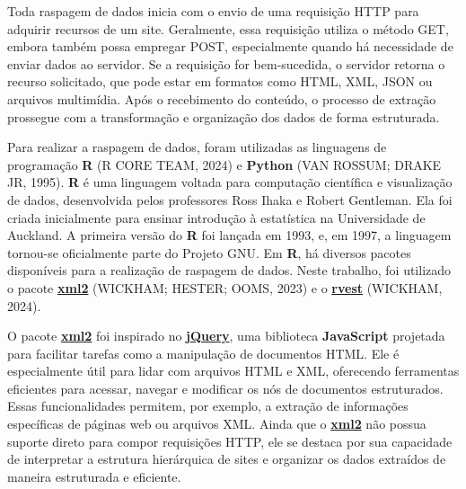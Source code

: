 \documentclass[
  12pt,
  a4paper,
]{scrreprt}
\begin{document}
Toda raspagem de dados inicia com o envio de uma requisição HTTP para
adquirir recursos de um site. Geralmente, essa requisição utiliza o
método GET, embora também possa empregar POST, especialmente quando há
necessidade de enviar dados ao servidor. Se a requisição for
bem-sucedida, o servidor retorna o recurso solicitado, que pode estar em
formatos como HTML, XML, JSON ou arquivos multimídia. Após o recebimento
do conteúdo, o processo de extração prossegue com a transformação e
organização dos dados de forma estruturada.

\vspace{12pt}

Para realizar a raspagem de dados, foram utilizadas as linguagens de
programação \textbf{R} (R CORE TEAM, 2024) e \textbf{Python} (VAN
ROSSUM; DRAKE JR, 1995). \textbf{R} é uma linguagem voltada para
computação científica e visualização de dados, desenvolvida pelos
professores Ross Ihaka e Robert Gentleman. Ela foi criada inicialmente
para ensinar introdução à estatística na Universidade de Auckland. A
primeira versão do \textbf{R} foi lançada em 1993, e, em 1997, a
linguagem tornou-se oficialmente parte do Projeto GNU. Em \textbf{R}, há
diversos pacotes disponíveis para a realização de raspagem de dados.
Neste trabalho, foi utilizado o pacote
\href{https://xml2.r-lib.org/}{\textbf{xml2}} (WICKHAM; HESTER; OOMS,
2023) e o \href{https://rvest.tidyverse.org/}{\textbf{rvest}} (WICKHAM,
2024).

\vspace{12pt}

O pacote \href{https://xml2.r-lib.org/}{\textbf{xml2}} foi inspirado no
\href{https://jquery.com/}{\textbf{jQuery}}, uma biblioteca
\textbf{JavaScript} projetada para facilitar tarefas como a manipulação
de documentos HTML. Ele é especialmente útil para lidar com arquivos
HTML e XML, oferecendo ferramentas eficientes para acessar, navegar e
modificar os nós de documentos estruturados. Essas funcionalidades
permitem, por exemplo, a extração de informações específicas de páginas
web ou arquivos XML. Ainda que o
\href{https://xml2.r-lib.org/}{\textbf{xml2}} não possua suporte direto
para compor requisições HTTP, ele se destaca por sua capacidade de
interpretar a estrutura hierárquica de sites e organizar os dados
extraídos de maneira estruturada e eficiente.

\vspace{12pt}
\end{document}

